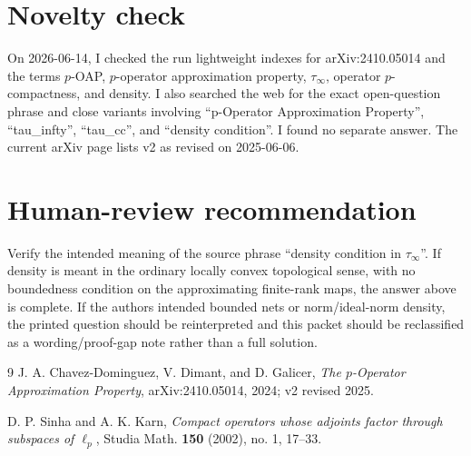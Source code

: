 \documentclass[11pt]{article}
\begin{document}
\section*{Novelty check}

On 2026-06-14, I checked the run lightweight indexes for arXiv:2410.05014 and
the terms \(p\)-OAP, \(p\)-operator approximation property, \(\tau_\infty\),
operator \(p\)-compactness, and density.  I also searched the web for the
exact open-question phrase and close variants involving
``p-Operator Approximation Property'', ``tau\_infty'', ``tau\_cc'', and
``density condition''.  I found no separate answer.  The current arXiv page
lists v2 as revised on 2025-06-06.

\section*{Human-review recommendation}

Verify the intended meaning of the source phrase ``density condition in
\(\tau_\infty\)''.  If density is meant in the ordinary locally convex
topological sense, with no boundedness condition on the approximating
finite-rank maps, the answer above is complete.  If the authors intended
bounded nets or norm/ideal-norm density, the printed question should be
reinterpreted and this packet should be reclassified as a wording/proof-gap
note rather than a full solution.

\begin{thebibliography}{9}
J. A. Chavez-Dominguez, V. Dimant, and D. Galicer,
\emph{The \(p\)-Operator Approximation Property},
arXiv:2410.05014, 2024; v2 revised 2025.

D. P. Sinha and A. K. Karn,
\emph{Compact operators whose adjoints factor through subspaces of \(\ell_p\)},
Studia Math. \textbf{150} (2002), no. 1, 17--33.
\end{thebibliography}
\end{document}
